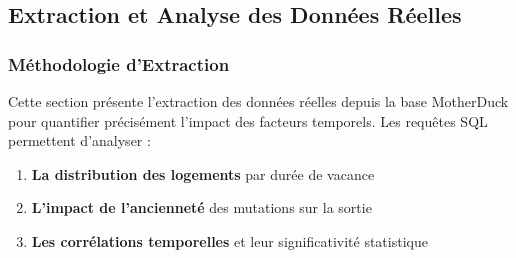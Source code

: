 \documentclass[11pt]{article}
\providecommand{\tightlist}{%
      \setlength{\itemsep}{0pt}\setlength{\parskip}{0pt}}
\begin{document}
    

    \subsection{Extraction et Analyse des Données
Réelles}\label{extraction-et-analyse-des-donnuxe9es-ruxe9elles}

\subsubsection{Méthodologie
d'Extraction}\label{muxe9thodologie-dextraction}

Cette section présente l'extraction des données réelles depuis la base
MotherDuck pour quantifier précisément l'impact des facteurs temporels.
Les requêtes SQL permettent d'analyser :

\begin{enumerate}
\def\labelenumi{\arabic{enumi}.}
\tightlist
\item
  \textbf{La distribution des logements} par durée de vacance
\item
  \textbf{L'impact de l'ancienneté} des mutations sur la sortie
\item
  \textbf{Les corrélations temporelles} et leur significativité
  statistique
\end{enumerate}
\end{document}
